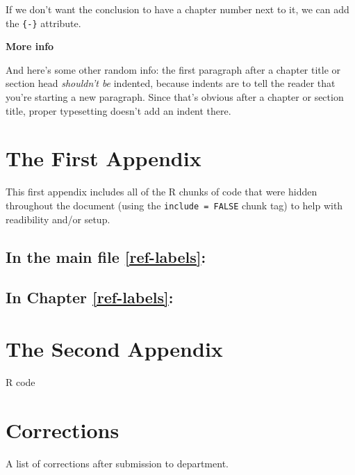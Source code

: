 \documentclass[12pt, twoside]{amherstthesis}
\begin{document}
If we don't want the conclusion to have a chapter number next to it, we can add the \texttt{\{-\}} attribute.

\textbf{More info}

And here's some other random info: the first paragraph after a chapter title or section head \emph{shouldn't be} indented, because indents are to tell the reader that you're starting a new paragraph. Since that's obvious after a chapter or section title, proper typesetting doesn't add an indent there.

\appendix

\hypertarget{the-first-appendix}{%
\chapter{The First Appendix}\label{the-first-appendix}}

This first appendix includes all of the R chunks of code that were hidden throughout the document (using the \texttt{include\ =\ FALSE} chunk tag) to help with readibility and/or setup.

\hypertarget{in-the-main-file-refref-labels}{%
\section{In the main file \ref{ref-labels}:}\label{in-the-main-file-refref-labels}}

\hypertarget{in-chapter-refref-labels}{%
\section{In Chapter \ref{ref-labels}:}\label{in-chapter-refref-labels}}

\hypertarget{the-second-appendix}{%
\chapter{The Second Appendix}\label{the-second-appendix}}

R code

\hypertarget{corrections}{%
\chapter*{Corrections}\label{corrections}}

A list of corrections after submission to department.
\end{document}
